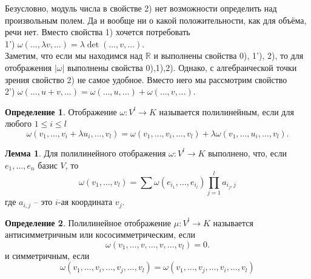 \documentclass[10pt,a4paper,oneside]{book} %
\theoremstyle{definition}
\newtheorem*{defn}{Определение}
\newtheorem{lem}{Лемма}
\newcommand{\mb}[1]{\mathbb{#1}}
\def\lm{\begin{lem}}
\def\elm{\end{lem}}
\begin{document}
Безусловно, модуль числа в свойстве 2) нет возможности определить над произвольным полем. Да и вообще ни о какой положительности, как для объёма, речи нет. Вместо свойства 1) хочется потребовать\\
1') $\omega(\dots,\lambda v,\dots)=\lambda \det(\dots,v,\dots)$.\\

Заметим, что если мы находимся над $\mb R$ и  выполнены свойства 0), 1'), 2), то для отображения $|\omega|$ выполнены свойства 0),1),2). Однако, с алгебраической точки зрения свойство 2) не самое удобное. Вместо него мы рассмотрим свойство\\
2') $\omega(\dots,u+v,\dots)=\omega(\dots,u,\dots)+\omega(\dots,v,\dots)$.


\begin{defn}
Отображение $\omega \colon  V^l\to K $ называется полилинейным, если для любого $1\leq i\leq l$ 
$$\omega(v_1,\dots,v_i+\lambda u_i,\dots, v_l)= \omega(v_1,\dots,v_i,\dots, v_l)+\lambda\omega(v_1,\dots,u_i,\dots, v_l).$$
\end{defn}

\lm Для полилинейного отображения $\omega \colon V^l \to K $ выполнено, что, если $e_1,\dots,e_n$ базис $V$, то 
$$\omega(v_1,\dots,v_l)=\sum \omega(e_{i_1},\dots,e_{i_l}) \prod_{j=1}^l a_{i_j,j}$$
где $a_{i,j}$ -- это $i$-ая координата $v_j$.\\
\elm

\begin{defn}
Полилинейное отображение $\mu \colon V^l\to K $ называется антисимметричным или кососимметрическим, если 
$$\omega(v_1,\dots,v,\dots,v,\dots, v_l)=0.$$ и симметричным, если
$$\omega(v_1,\dots,v_i,\dots,v_j,\dots, v_l)=\omega(v_1,\dots,v_j,\dots,v_i,\dots, v_l)$$
\end{defn}
\end{document}
